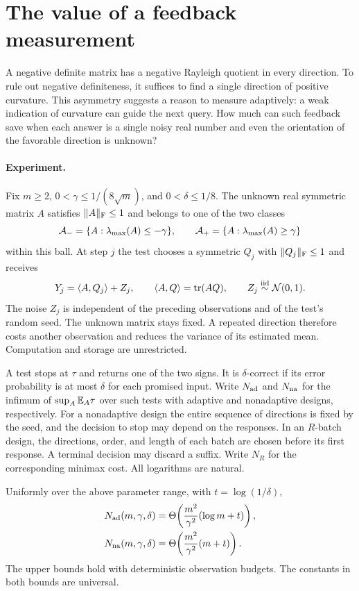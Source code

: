 \section{The value of a feedback measurement}

A negative definite matrix has a negative Rayleigh quotient in every direction. To rule out negative definiteness, it suffices to find a single direction of positive curvature. This asymmetry suggests a reason to measure adaptively: a weak indication of curvature can guide the next query. How much can such feedback save when each answer is a single noisy real number and even the orientation of the favorable direction is unknown?

\paragraph{Experiment.}
Fix \(m\ge2\), \(0<\gamma\le1/(8\sqrt m)\), and \(0<\delta\le1/8\). The unknown real symmetric matrix \(A\) satisfies \(\|A\|_{\mathrm F}\le1\) and belongs to one of the two classes
\[
 \mathcal A_-=\{A:\lambda_{\max}(A)\le-\gamma\},\qquad
 \mathcal A_+=\{A:\lambda_{\max}(A)\ge\gamma\}
\]
within this ball. At step \(j\) the test chooses a symmetric \(Q_j\) with \(\|Q_j\|_{\mathrm F}\le1\) and receives
\begin{equation}\label{eq:observation}
 Y_j=\left\langle A,Q_j\right\rangle+Z_j,\qquad
 \left\langle A,Q\right\rangle=\operatorname{tr}(AQ),\qquad Z_j\overset{\mathrm{iid}}{\sim}\mathcal N(0,1).
\end{equation}
The noise \(Z_j\) is independent of the preceding observations and of the test's random seed. The unknown matrix stays fixed. A repeated direction therefore costs another observation and reduces the variance of its estimated mean. Computation and storage are unrestricted.

A test stops at \(\tau\) and returns one of the two signs. It is \(\delta\)-correct if its error probability is at most \(\delta\) for each promised input. Write \(N_{\mathrm{ad}}\) and \(N_{\mathrm{na}}\) for the infimum of \(\sup_A\mathbb E_A\tau\) over such tests with adaptive and nonadaptive designs, respectively. For a nonadaptive design the entire sequence of directions is fixed by the seed, and the decision to stop may depend on the responses. In an \(R\)-batch design, the directions, order, and length of each batch are chosen before its first response. A terminal decision may discard a suffix. Write \(N_R\) for the corresponding minimax cost. All logarithms are natural.

\begin{theorem}\label{thm:samples}
Uniformly over the above parameter range, with \(t=\log(1/\delta)\),
\begin{align}
 N_{\mathrm{ad}}(m,\gamma,\delta)&=\Theta\!\left(\frac{m^2}{\gamma^2}(\log m+t)\right),\label{eq:ad}\\
 N_{\mathrm{na}}(m,\gamma,\delta)&=\Theta\!\left(\frac{m^2}{\gamma^2}(m+t)\right).\label{eq:na}
\end{align}
The upper bounds hold with deterministic observation budgets. The constants in both bounds are universal.
\end{theorem}

